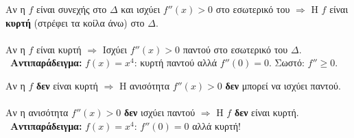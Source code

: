 \theor{\true}
Αν η $f$ είναι συνεχής στο $\Delta$ και ισχύει $f''(x)>0$ στο εσωτερικό του $\Rightarrow$ Η $f$ είναι \textbf{κυρτή} (στρέφει τα κοίλα άνω) στο $\Delta$.\\\\
\antistr{\false}
Αν η $f$ είναι κυρτή $\Rightarrow$ Ισχύει $f''(x)>0$ παντού στο εσωτερικό του $\Delta$.\\
\textcolor{error}{\faTimes\ \textbf{Αντιπαράδειγμα:}} $f(x)=x^4$: κυρτή παντού αλλά $f''(0)=0$. Σωστό: $f''\ge 0$.
\begin{center}
\end{center}
\aath{\true}
Αν η $f$ \textbf{δεν} είναι κυρτή $\Rightarrow$ Η ανισότητα $f''(x)>0$ \textbf{δεν} μπορεί να ισχύει παντού.\\\\
\aaa{\false}
Αν η ανισότητα $f''(x)>0$ \textbf{δεν} ισχύει παντού $\Rightarrow$ Η $f$ \textbf{δεν} είναι κυρτή.\\
\textcolor{error}{\faTimes\ \textbf{Αντιπαράδειγμα:}} $f(x)=x^4$: $f''(0)=0$ αλλά κυρτή!

\newpage
{}

